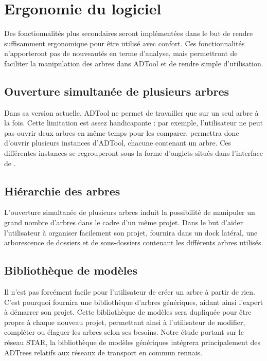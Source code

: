 \section{Ergonomie du logiciel}
	Des fonctionnalités plus secondaires seront implémentées dans le but de rendre \glasir{} suffisamment ergonomique pour être utilisé avec confort. Ces fonctionnalités n'apporteront pas de nouveautés en terme d'analyse, mais permettront de faciliter la manipulation des arbres dans ADTool et de rendre \glasir{} simple d'utilisation.	

	\subsection{Ouverture simultanée de plusieurs arbres}
		Dans sa version actuelle, ADTool ne permet de travailler que sur un seul arbre à la fois. Cette limitation est assez handicapante : par exemple, l'utilisateur ne peut pas ouvrir deux arbres en même temps pour les comparer. \glasir{} permettra donc d'ouvrir plusieurs instances d'ADTool, chacune contenant un arbre. Ces différentes instances se regrouperont sous la forme d'onglets situés dans l'interface de \glasir{}.
	
	\subsection{Hiérarchie des arbres}
		L'ouverture simultanée de plusieurs arbres induit la possibilité de manipuler un grand nombre d'arbres dans le cadre d'un même projet. Dans le but d'aider l'utilisateur à organiser facilement son projet, \glasir{} fournira dans un dock latéral, une arborescence de dossiers et de sous-dossiers contenant les différents arbres utilisés.

	\subsection{Bibliothèque de modèles}
		Il n'est pas forcément facile pour l'utilisateur de créer un arbre à partir de rien. C'est pourquoi \glasir{} fournira une bibliothèque d'arbres génériques, aidant ainsi l'expert à démarrer son projet. Cette bibliothèque de modèles sera dupliquée pour être propre à chaque nouveau projet, permettant ainsi à l'utilisateur de modifier, compléter ou élaguer les arbres selon ses besoins. Notre étude portant sur le réseau STAR, la bibliothèque de modèles génériques intégrera principalement des ADTrees relatifs aux réseaux de transport en commun rennais. 

